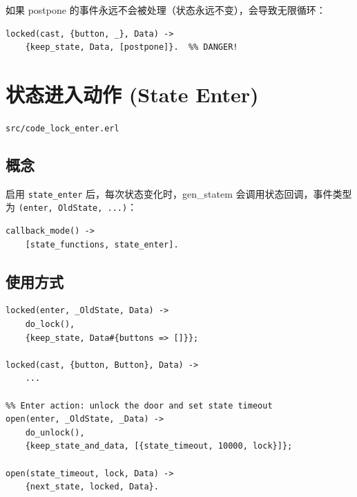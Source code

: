 \documentclass[a4paper,11pt]{article}
\begin{document}
\begin{warnbox}
如果 postpone 的事件永远不会被处理（状态永远不变），会导致无限循环：
\begin{lstlisting}[style=erlangstyle]
%% BAD: postpone without state change = infinite loop
locked(cast, {button, _}, Data) ->
    {keep_state, Data, [postpone]}.  %% DANGER!
\end{lstlisting}
\end{warnbox}


\section{状态进入动作 (State Enter)}

\begin{notebox}[源码文件]
\texttt{src/code\_lock\_enter.erl}
\end{notebox}

\subsection{概念}

启用 \texttt{state\_enter} 后，每次状态变化时，gen\_statem 会调用状态回调，事件类型为 \texttt{(enter, OldState, ...)}：

\begin{lstlisting}[style=erlangstyle]
callback_mode() ->
    [state_functions, state_enter].
\end{lstlisting}

\subsection{使用方式}

\begin{lstlisting}[style=erlangstyle]
%% Enter action: lock the door and clear buttons
locked(enter, _OldState, Data) ->
    do_lock(),
    {keep_state, Data#{buttons => []}};

locked(cast, {button, Button}, Data) ->
    ...

%% Enter action: unlock the door and set state timeout
open(enter, _OldState, _Data) ->
    do_unlock(),
    {keep_state_and_data, [{state_timeout, 10000, lock}]};

open(state_timeout, lock, Data) ->
    {next_state, locked, Data}.
\end{lstlisting}
\end{document}
